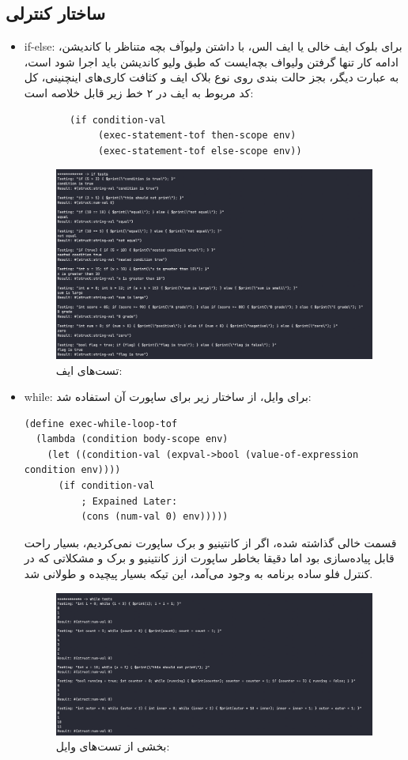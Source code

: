 \documentclass{article}
\begin{document}
\subsection{ساختار کنترلی}
\begin{itemize}
        \item if-else:
        برای بلوک ایف خالی یا ایف الس، با داشتن ولیو‌آف بچه متناظر با کاندیشن، ادامه کار تنها گرفتن ولیو‌اف بچه‌ایست که طبق ولیو کاندیشن باید اجرا شود است،
        به عبارت دیگر،‌ بجز حالت بندی روی نوع بلاک ایف و کثافت کاری‌های اینچنینی، کل کد مربوط به ایف در ۲ خط زیر قابل خلاصه است:
        \begin{verbatim}
        (if condition-val
             (exec-statement-tof then-scope env)
             (exec-statement-tof else-scope env))
        \end{verbatim}

        \begin{figure}[h]
        \centering
        \includegraphics[width=0.5\linewidth]{pics/tif.png}
        \caption{تست‌های ایف:}
\end{figure}
\FloatBarrier
        \item while:
        برای وایل، 
        از ساختار زیر برای ساپورت آن استفاده شد:
        \begin{verbatim}
(define exec-while-loop-tof
  (lambda (condition body-scope env)
    (let ((condition-val (expval->bool (value-of-expression condition env))))
      (if condition-val
          ; Expained Later:
          (cons (num-val 0) env)))))
        \end{verbatim}


قسمت خالی گذاشته شده، اگر از کانتینیو و برک ساپورت نمی‌کردیم، بسیار راحت قابل پیاده‌سازی بود اما دقیقا بخاطر ساپورت ازز کانتینیو و برک و مشکلاتی که در 
کنترل فلو ساده برنامه به وجود می‌آمد، این تیکه بسیار پیچیده و طولانی شد.
        \begin{figure}[h]
        \centering
        \includegraphics[width=0.5\linewidth]{pics/twhile.png}
        \caption{بخشی از تست‌های وایل:}
\end{figure}
\FloatBarrier
\end{itemize}
\end{document}
